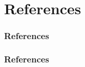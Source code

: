 \documentclass{beamer}
\begin{document}



\section{References}


\begin{frame}[allowframebreaks]
\frametitle{References}


\frametitle{References}

\end{frame}
\end{document}
